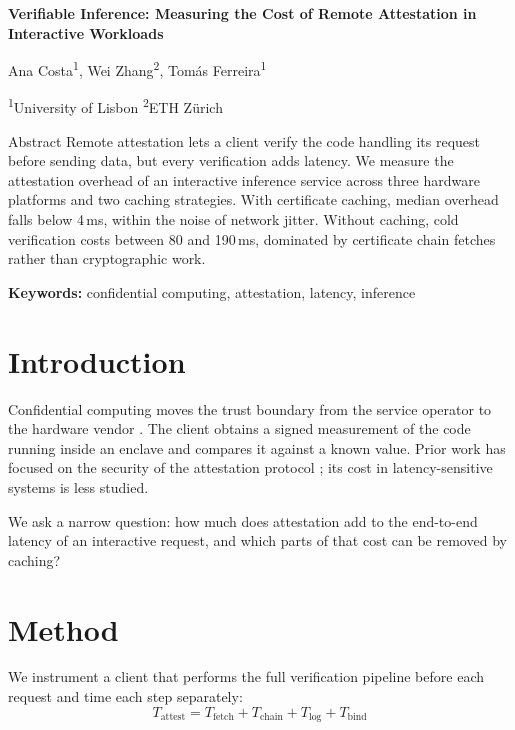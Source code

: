 \documentclass[11pt]{article}
\newcommand{\PaperTitle}{Verifiable Inference: Measuring the Cost of Remote Attestation in Interactive Workloads}
\newcommand{\Authors}{Ana Costa\textsuperscript{1}, Wei Zhang\textsuperscript{2}, Tomás Ferreira\textsuperscript{1}}
\newcommand{\Affiliations}{\textsuperscript{1}University of Lisbon \quad \textsuperscript{2}ETH Zürich}
\newcommand{\Keywords}{confidential computing, attestation, latency, inference}
\begin{document}
\begin{center}
  {\sffamily\LARGE\bfseries\PaperTitle}\par\vspace{0.6em}{\color{accent}\rule{2.5em}{3pt}}\par\vspace{0.8em}
  \Authors\par\vspace{0.3em}
  {\small\color{muted}\Affiliations}\par\vspace{1.5em}
\end{center}
\begin{keybox}{Abstract}\small
Remote attestation lets a client verify the code handling its request before sending data, but every verification adds latency. We measure the attestation overhead of an interactive inference service across three hardware platforms and two caching strategies. With certificate caching, median overhead falls below 4\,ms, within the noise of network jitter. Without caching, cold verification costs between 80 and 190\,ms, dominated by certificate chain fetches rather than cryptographic work.\par\vspace{0.4em}
{\sffamily\bfseries Keywords:} \Keywords
\end{keybox}

\section{Introduction}
Confidential computing moves the trust boundary from the service operator to the hardware vendor \citep{costan2016}. The client obtains a signed measurement of the code running inside an enclave and compares it against a known value. Prior work has focused on the security of the attestation protocol \citep{menetrey2022}; its cost in latency-sensitive systems is less studied.

We ask a narrow question: how much does attestation add to the end-to-end latency of an interactive request, and which parts of that cost can be removed by caching?

\section{Method}
We instrument a client that performs the full verification pipeline before each request and time each step separately:
\begin{equation}
  T_{\mathrm{attest}} = T_{\mathrm{fetch}} + T_{\mathrm{chain}} + T_{\mathrm{log}} + T_{\mathrm{bind}}
\end{equation}
\end{document}
